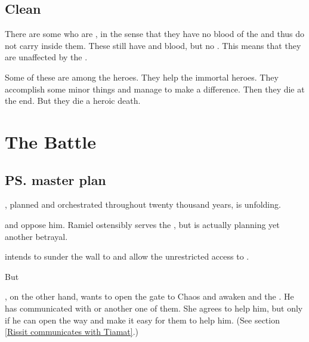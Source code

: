\subsection{Clean \humans}
There are some \humans who are , in the sense that they have no blood of the  and thus do not carry \Lithrim inside them. 
These \humans still have \bane and \resphan blood, but no \Lithrim.
This means that they are unaffected by the . 

Some of these \humans are among the heroes. 
They help the immortal heroes.
They accomplish some minor things and manage to make a difference. 
Then they die at the end.
But they die a heroic death. 

















\section{The \Matrices Battle}









\subsection{\ps{\Daggerrain} master plan}
, planned and orchestrated throughout twenty thousand years, is unfolding. 

\Secherdamon{} and \Ishnaruchaefir{} oppose him. Ramiel ostensibly serves the \banes, but is actually planning yet another betrayal.

\Daggerrain{} intends to sunder the wall to \Erebos{} and allow the \Voidbringer{} unrestricted access to \Miith{}. 

But \prikker

\Secherdamon, on the other hand, wants to open the gate to Chaos and awaken \Tiamat{} and the \firstgendragons. He has communicated with \KhothSell{} or another one of them. She agrees to help him, but only if he can open the way and make it easy for them to help him. (See section \ref{Rissit communicates with Tiamat}.)

